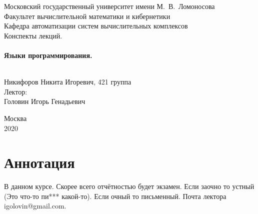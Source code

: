 \documentclass[a4paper, 12pt, titlepage, finall]{extreport}
\begin{document}
    \begin{titlepage}
        \begin{center}
            {\small \sc Московский государственный университет имени М.~В.~Ломоносова\\
            Факультет вычислительной математики и кибернетики\\
            Кафедра автоматизации систем вычислительных комплексов\\}
            \vfill
            {\large \sc Конспекты лекций.}\\~\\

            {\large \bf Языки программирования.}\\~\\

        \end{center}
        
        \begin{flushright}
            \vfill
            \vfill
            {Никифоров Никита Игоревич, 421 группа}\\
            {Лектор:}\\
            {Головин Игорь Генадьевич}\\
        \end{flushright}

        \begin{center}
            \vfill
            {\small Москва\\2020}
        \end{center}
    \end{titlepage}

    \chapter*{Аннотация}
        В данном курсе. 
        Скорее всего отчётностью будет экзамен. Если заочно то устный (Это что-то пи*** какой-то). Если очный то письменный. Почта лектора igolovin@gmail.com.
    \newpage
    \tableofcontents
    \newpage
\end{document}
